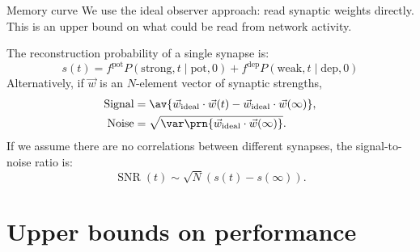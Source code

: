 \documentclass[final,hyperref={pdfpagelabels=false,bookmarks=false}]{beamer}
\DeclareMathOperator{\SNR}{SNR}
\newcommand{\pot}{^\text{pot}}
\newcommand{\dep}{^\text{dep}}
\newcommand{\W}{\vec{w}}
\begin{document}
\begin{frame}{}
\begin{columns}[t]
\begin{column}{0.37\linewidth}
\begin{block}{Memory curve}
%
 We use the ideal observer approach: read synaptic weights directly.
 This is an upper bound on what could be read from network activity.

 The reconstruction probability of a single synapse is:
 \begin{equation*}
   s(t) = f\pot P(\text{strong},t\mid\text{pot},0) + f\dep P(\text{weak},t\mid\text{dep},0)
 \end{equation*}
 Alternatively, if $\W$ is an $N$-element vector of synaptic strengths,
 \begin{equation*}
   \begin{aligned}
     \text{Signal} &= \av{\W_\text{ideal} \cdot \W(t) -  \W_\text{ideal} \cdot \W(\infty)}, \\
     \text{Noise} &= \sqrt{\var\prn{\W_\text{ideal} \cdot \W(\infty)}}.
   \end{aligned}
 \end{equation*}
 If we assume there are no correlations between different synapses, the signal-to-noise ratio is:
 \begin{equation*}
   \SNR(t) \sim \sqrt{N}(s(t)-s(\infty)).
 \end{equation*}
%
\end{block}


\section{Upper bounds on performance}



\end{column}
\end{columns}
\end{frame}
\end{document}
